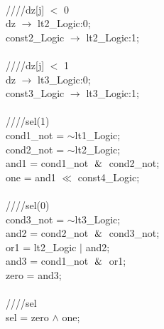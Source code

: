    \\
   \hspace*{2em}////dz[j] $<$ 0 \\
   \hspace*{2em}dz $\rightarrow$ lt2\_Logic:0; \\
   \hspace*{2em}const2\_Logic $\rightarrow$ lt2\_Logic:1; \\
   \\
   \hspace*{2em}////dz[j] $<$ 1 \\
   \hspace*{2em}dz $\rightarrow$ lt3\_Logic:0; \\
   \hspace*{2em}const3\_Logic $\rightarrow$ lt3\_Logic:1; \\
   \\
   \hspace*{2em}////sel(1) \\
   \hspace*{2em}cond1\_not = $\sim$lt1\_Logic; \\
   \hspace*{2em}cond2\_not = $\sim$lt2\_Logic; \\
   \hspace*{2em}and1 = cond1\_not $\And$ cond2\_not; \\
   \hspace*{2em}one = and1 $\ll$ const4\_Logic; \\
   \\
   \hspace*{2em}////sel(0) \\
   \hspace*{2em}cond3\_not = $\sim$lt3\_Logic; \\
   \hspace*{2em}and2 = cond2\_not $\And$ cond3\_not; \\
   \hspace*{2em}or1 = lt2\_Logic $\vert$ and2; \\
   \hspace*{2em}and3 = cond1\_not $\And$ or1; \\
   \hspace*{2em}zero = and3; \\
   \\
   \hspace*{2em}////sel \\
   \hspace*{2em}sel = zero $\wedge$ one; \\
